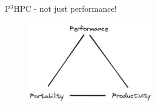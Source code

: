 \documentclass[10pt,aspectratio=169]{beamer}
\begin{document}
\begin{frame}{P$^3$HPC - not just performance!}

    
    \begin{figure}[H]
        \includegraphics[width=0.5\textwidth]{images/excalidraw_p3_triangle.png}
        \vspace*{0.75cm}
        \label{fig:warwick_mantevo_link}
    \end{figure}

    
\end{frame}
\end{document}
